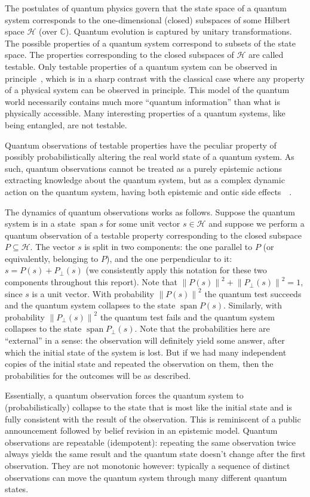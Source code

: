 \documentclass[a4paper]{article}
\newcommand{\HH}{\mathcal{H}}
\newcommand{\CC}{\mathbb{C}}
\DeclareMathOperator{\spn}{span}
\newcommand{\ppar}[1]{#1}
\newcommand{\pper}[1]{#1_{\perp}}
\newcommand{\norm}[1]{\left\lVert#1\right\rVert}
\begin{document}
The postulates of quantum physics govern that the state space of a quantum
system corresponds to the one-dimensional (closed) subspaces of some Hilbert
space $\HH$ (over $\CC$). Quantum evolution is captured by unitary
transformations. The possible properties of a quantum system correspond to
subsets of the state space. The properties corresponding to the closed subspaces
of $\HH$ are called testable. Only testable properties of a quantum system can
be observed in principle~\cite{wlogqm}, which is in a sharp contrast with the classical case
where any property of a physical system can be observed in principle. This model
of the quantum world necessarily contains much more ``quantum information'' than
what is physically accessible. Many interesting properties of a quantum systems,
like being entangled, are not testable.

Quantum observations of testable properties have the peculiar property of
possibly probabilistically altering the real world state of a quantum system. As
such, quantum observations cannot be treated as a purely epistemic actions
extracting knowledge about the quantum system, but as a complex dynamic action
on the quantum system, having both epistemic and ontic side
effects~\cite{wlogqm}~\cite{dlpqb}.

The dynamics of quantum observations works as follows. Suppose the quantum
system is in a state $\spn s$ for some unit vector $s \in \HH$ and suppose we
perform a quantum observation of a testable property corresponding to the closed
subspace $P \subseteq \HH$. The vector $s$ is split in two components: the one
parallel to $P$ (or equivalently, belonging to $P$), and the one perpendicular
to it: $s = \ppar{P}(s) + \pper{P}(s)$ (we consistently apply this notation for
these two components throughout this report). Note that $\norm{\ppar{P}(s)}^2 +
\norm{\pper{P}(s)}^2 = 1$, since $s$ is a unit vector. With probability
$\norm{\ppar{P}(s)}^2$ the quantum test succeeds and the quantum system
collapses to the state $\spn \ppar{P}(s)$.  Similarly, with probability
$\norm{\pper{P}(s)}^2$ the quantum test fails and the quantum system collapses
to the state $\spn \pper{P}(s)$. Note that the probabilities here are
``external'' in a sense: the observation will definitely yield some answer,
after which the initial state of the system is lost. But if we had many
independent copies of the initial state and repeated the observation on them,
then the probabilities for the outcomes will be as described.

Essentially, a quantum observation forces the quantum system to
(probabilistically) collapse to the state that is most like the initial state
and is fully consistent with the result of the observation. This is reminiscent
of a public announcement followed by belief revision in an epistemic model.
Quantum observations are repeatable (idempotent): repeating the same observation
twice always yields the same result and the quantum state doesn't change after
the first observation. They are not monotonic however: typically a sequence of
distinct observations can move the quantum system through many different quantum
states.
\end{document}
